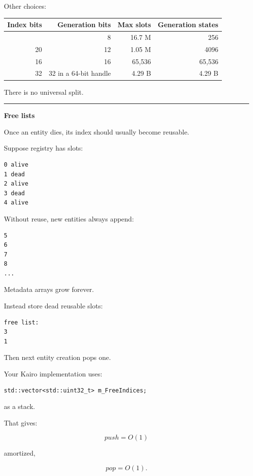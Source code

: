 Other choices:

{\def\LTcaptype{none} %
\begin{longtable}[]{@{}rrrr@{}}
\toprule\noalign{}
Index bits & Generation bits & Max slots & Generation states \\
\midrule\noalign{}
\endhead
\bottomrule\noalign{}
\endlastfoot
24 & 8 & 16.7 M & 256 \\
20 & 12 & 1.05 M & 4096 \\
16 & 16 & 65,536 & 65,536 \\
32 & 32 in a 64-bit handle & 4.29 B & 4.29 B \\
\end{longtable}
}

There is no universal split.

\begin{center}\rule{0.5\linewidth}{0.5pt}\end{center}

\textbf{Free lists}

Once an entity dies, its index should usually become reusable.

Suppose registry has slots:

\begin{verbatim}
0 alive
1 dead
2 alive
3 dead
4 alive
\end{verbatim}

Without reuse, new entities always append:

\begin{verbatim}
5
6
7
8
...
\end{verbatim}

Metadata arrays grow forever.

Instead store dead reusable slots:

\begin{verbatim}
free list:
3
1
\end{verbatim}

Then next entity creation pops one.

Your Kairo implementation uses:

\begin{verbatim}
std::vector<std::uint32_t> m_FreeIndices;
\end{verbatim}

as a stack.

That gives:

\[
push=O(1)
\]

amortized,

\[
pop=O(1).
\]

